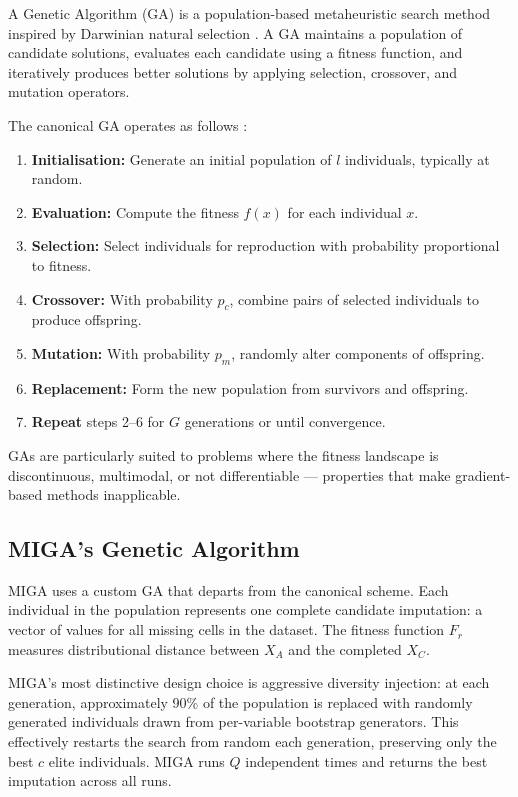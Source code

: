 A Genetic Algorithm (GA) is a population-based metaheuristic search method inspired by Darwinian natural selection \cite{Holland1975}. A GA maintains a population of candidate solutions, evaluates each candidate using a fitness function, and iteratively produces better solutions by applying selection, crossover, and mutation operators.

The canonical GA operates as follows \cite{Goldberg1989}:

\begin{enumerate}
    \item \textbf{Initialisation:} Generate an initial population of $l$ individuals, typically at random.
    \item \textbf{Evaluation:} Compute the fitness $f(x)$ for each individual $x$.
    \item \textbf{Selection:} Select individuals for reproduction with probability proportional to fitness.
    \item \textbf{Crossover:} With probability $p_c$, combine pairs of selected individuals to produce offspring.
    \item \textbf{Mutation:} With probability $p_m$, randomly alter components of offspring.
    \item \textbf{Replacement:} Form the new population from survivors and offspring.
    \item \textbf{Repeat} steps 2--6 for $G$ generations or until convergence.
\end{enumerate}

GAs are particularly suited to problems where the fitness landscape is discontinuous, multimodal, or not differentiable --- properties that make gradient-based methods inapplicable.

\subsection{MIGA's Genetic Algorithm}

MIGA \cite{FigueroaGarcia2023} uses a custom GA that departs from the canonical scheme. Each individual in the population represents one complete candidate imputation: a vector of values for all missing cells in the dataset. The fitness function $F_r$ measures distributional distance between $X_A$ and the completed $X_C$.

MIGA's most distinctive design choice is aggressive diversity injection: at each generation, approximately 90\% of the population is replaced with randomly generated individuals drawn from per-variable bootstrap generators. This effectively restarts the search from random each generation, preserving only the best $c$ elite individuals. MIGA runs $Q$ independent times and returns the best imputation across all runs.

